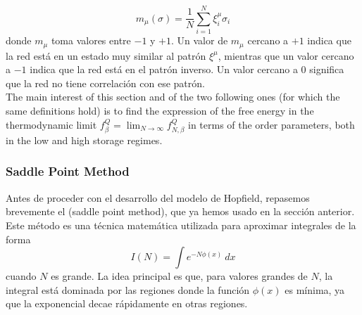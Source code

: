 \begin{equation*}
    m_\mu(\sigma) = \frac{1}{N} \sum_{i=1}^{N} \xi_i^\mu \sigma_i
\end{equation*}
donde $m_\mu$ toma valores entre $-1$ y $+1$. Un valor de $m_\mu$ cercano a $+1$ indica que la red está en un estado muy similar al patrón $\xi^\mu$, mientras que un valor cercano a $-1$ indica que la red está en el patrón inverso. Un valor cercano a $0$ significa que la red no tiene correlación con ese patrón. \\

\noindent
The main interest of this section and of the two following ones (for which the same
definitions hold) is to find the expression of the free energy in the thermodynamic limit
$f_\beta^Q = \lim_{N \to \infty} f_{N,\beta}^Q$ in terms of the order parameters, both in the low and high storage regimes.

\subsubsection{Saddle Point Method}
\noindent
Antes de proceder con el desarrollo del modelo de Hopfield, repasemos brevemente el  (saddle point method), que ya hemos usado en la sección anterior. Este método es una técnica matemática utilizada para aproximar integrales de la forma
\begin{equation*}
    I(N) = \int e^{-N \phi(x)} \ dx
\end{equation*}
cuando $N$ es grande. La idea principal es que, para valores grandes de $N$, la integral está dominada por las regiones donde la función $\phi(x)$ es mínima, ya que la exponencial decae rápidamente en otras regiones. \\

